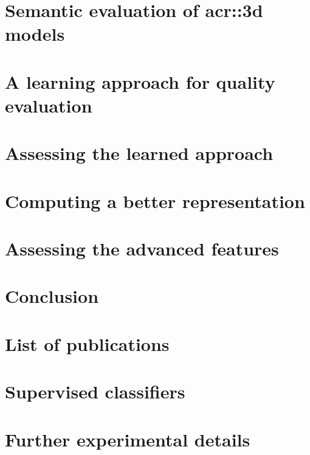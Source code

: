 \documentclass[12pt, twoside]{book}
\begin{document}
    \chapter{Semantic evaluation of \texorpdfstring{\gls*{acr::3d}}{3D} models}
        \label{chap::semantic_evaluation}
        

    \chapter{A learning approach for quality evaluation}
        \label{chap::learned_evaluation}
        

    \chapter{Assessing the learned approach}
        \label{chap::experiments}
        

    \chapter{Computing a better representation}
        \label{chap::better_representation}
        

    \chapter{Assessing the advanced features}
        \label{chap::advanced_experiments}
        

    \chapter{Conclusion}
        \label{chap::conclusion}
        

    \appendix
    \chapter{List of publications}
        \label{chap::publications}
        
    \chapter{Supervised classifiers}
        \label{chap::classifiers}
        
    \chapter{Further experimental details}
        \label{chap::details}
        

    \printglossary[type=\acronymtype]
    \printglossary
    
    \printbibliography[heading=bibintoc]
    \printindex

    
\end{document}
